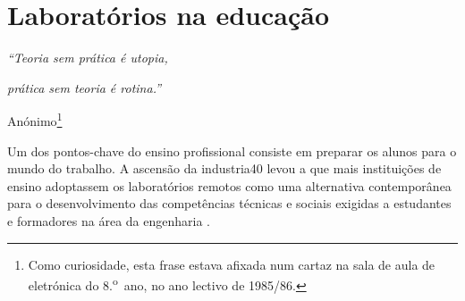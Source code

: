 
\section{Laboratórios na educação}
\label{Laboratoriosnaeducacao}

\begin{center}
    \textit{``Teoria sem prática é utopia,}

    \textit{prática sem teoria é rotina.''}

    Anónimo\footnote{Como curiosidade, esta frase estava afixada num cartaz na sala de aula de eletrónica do 8.\textsuperscript{o}~ano, no ano lectivo de 1985/86.}

\end{center}
Um dos pontos-chave do ensino profissional consiste em preparar os alunos para o mundo do trabalho. A ascensão da \gls{industria40} levou a que mais instituições de ensino adoptassem os laboratórios remotos como uma alternativa contemporânea para o desenvolvimento das competências técnicas e sociais exigidas a estudantes e formadores na área da engenharia \cite{EvaluationRemoteVirtualE-Learning}.


